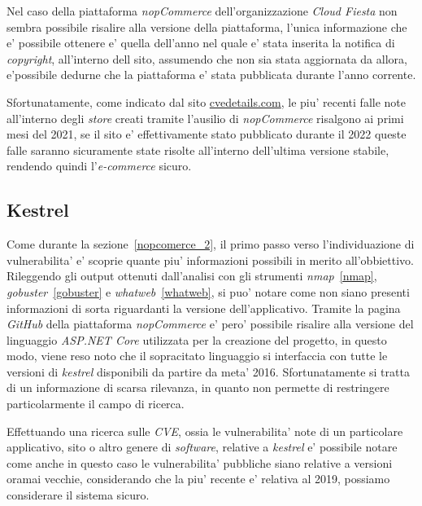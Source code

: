 \documentclass[a4paper]{report}
\begin{document}
				Nel caso della piattaforma \emph{nopCommerce} dell'organizzazione \emph{Cloud Fiesta} non sembra
				possibile risalire alla versione della piattaforma, l'unica informazione che e' possibile ottenere e'
				quella dell'anno nel quale e' stata inserita la notifica di \emph{copyright}, all'interno dell sito,
				assumendo che non sia stata aggiornata da allora, e'possibile dedurne che la piattaforma e' stata
				pubblicata durante l'anno corrente.

				Sfortunatamente, come indicato dal sito
				\href{https://www.cvedetails.com/vulnerability-list.php?vendor_id=19803&product_id=0&version_id=0&page=1&hasexp=0&opdos=0&opec=0&opov=0&opcsrf=0&opgpriv=0&opsqli=0&opxss=0&opdirt=0&opmemc=0&ophttprs=0&opbyp=0&opfileinc=0&opginf=0&cvssscoremin=0&cvssscoremax=0&year=0&cweid=0&order=1&trc=7&sha=e467697bc2d0e9c2996500ae46cf86049a8683c2}{cvedetails.com},
				le piu' recenti falle note all'interno degli \emph{store} creati tramite l'ausilio di \emph{nopCommerce}
				risalgono ai primi mesi del 2021, se il sito e' effettivamente stato pubblicato durante il 2022 queste
				falle saranno sicuramente state risolte all'interno dell'ultima versione stabile, rendendo quindi
				l'\emph{e-commerce} sicuro.
			\subsection{Kestrel}\label{kestrel}
				Come durante la sezione~\ref{nopcomerce_2}, il primo passo verso l'individuazione di vulnerabilita' e'
				scoprie quante piu' informazioni possibili in merito all'obbiettivo. Rileggendo gli output ottenuti
				dall'analisi con gli strumenti \emph{nmap}~\ref{nmap}, \emph{gobuster}~\ref{gobuster} e
				\emph{whatweb}~\ref{whatweb}, si puo' notare come non siano presenti informazioni di sorta riguardanti
				la versione dell'applicativo. Tramite la pagina \emph{GitHub} della piattaforma \emph{nopCommerce} e'
				pero' possibile risalire alla versione del linguaggio \emph{ASP.NET Core} utilizzata per la creazione
				del progetto, in questo modo, viene reso noto che il sopracitato linguaggio si interfaccia con tutte le
				versioni di \emph{kestrel} disponibili da partire da meta' 2016. Sfortunatamente si tratta di un
				informazione di scarsa rilevanza, in quanto non permette di restringere particolarmente il campo di
				ricerca.

				Effettuando una ricerca sulle \emph{CVE}, ossia le vulnerabilita' note di un particolare applicativo,
				sito o altro genere di \emph{software}, relative a \emph{kestrel} e' possibile notare come anche in
				questo caso le vulnerabilita' pubbliche siano relative a versioni oramai vecchie, considerando che la
				piu' recente e' relativa al 2019, possiamo considerare il sistema sicuro.
\end{document}
